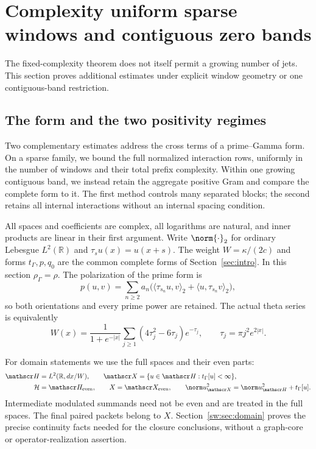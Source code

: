 \documentclass[11pt,a4paper]{article}
\numberwithin{equation}{section}
\theoremstyle{definition}\newtheorem{definition}[theorem]{Definition}
\theoremstyle{remark}\newtheorem{remark}[theorem]{Remark}
\newcommand{\R}{\mathbb R}\newcommand{\C}{\mathbb C}\newcommand{\N}{\mathbb N}
\newcommand{\tg}{t_\Gamma}\newcommand{\cg}{c_\Gamma}
\begin{document}
\section{Complexity uniform sparse windows and contiguous zero bands}\label{sec:sparse-bands}
The fixed-complexity theorem does not itself permit a growing number of jets. This section proves additional estimates under explicit window geometry or one contiguous-band restriction.

\subsection{The form and the two positivity regimes}\label{sw:sec:main}
Two complementary estimates address the cross terms of a prime--Gamma form. On a sparse family, we bound the full normalized interaction rows, uniformly in the number of windows and their total prefix complexity. Within one growing contiguous band, we instead retain the aggregate positive Gram and compare the complete form to it. The first method controls many separated blocks; the second retains all internal interactions without an internal spacing condition.

All spaces and coefficients are complex, all logarithms are natural, and inner products are linear in their first argument. Write $\norm{\cdot}_2$ for ordinary Lebesgue $L^2(\R)$ and $\tau_su(x)=u(x+s)$. The weight $W=\kappa/(2c)$ and forms $t_\Gamma,p,q_0$ are the common complete forms of Section~\ref{sec:intro}. In this section $\rho_\Gamma=\rho$. The polarization of the prime form is
\begin{equation}\label{sw:eq:p}
 p(u,v)=\sum_{n\ge2}a_n
 \bigl(\langle\tau_{s_n}u,v\rangle_2+\langle u,\tau_{s_n}v\rangle_2\bigr),
\end{equation}
so both orientations and every prime power are retained. The actual theta series is equivalently
\begin{equation}\label{sw:eq:W}
 W(x)=\frac{1}{1+e^{-|x|}}\sum_{j\ge1}(4\tau_j^2-6\tau_j)e^{-\tau_j},
 \qquad\tau_j=\pi j^2e^{2|x|}.
\end{equation}

For domain statements we use the full spaces and their even parts:
\begin{equation}\label{sw:eq:spaces}
 \begin{split}
 \mathscr H&=L^2(\R,dx/W),\qquad
 \mathscr X=\{u\in\mathscr H:\tg[u]<\infty\},\\
 \mathcal H&=\mathscr H_{\rm even},\qquad
 X=\mathscr X_{\rm even},\qquad
 \norm u_{\mathscr X}^2=\norm u_{\mathscr H}^2+\tg[u].
 \end{split}
\end{equation}
Intermediate modulated summands need not be even and are treated in the full spaces. The final paired packets belong to $X$. Section~\ref{sw:sec:domain} proves the precise continuity facts needed for the closure conclusions, without a graph-core or operator-realization assertion.
\end{document}
